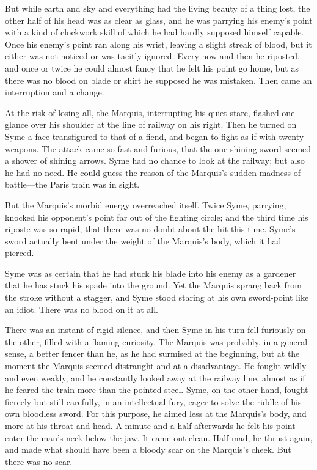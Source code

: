But while earth and sky and everything had the living beauty of a thing lost, the other half of his head was as clear as glass, and he was parrying his enemy’s point with a kind of clockwork skill of which he had hardly supposed himself capable. Once his enemy’s point ran along his wrist, leaving a slight streak of blood, but it either was not noticed or was tacitly ignored. Every now and then he riposted, and once or twice he could almost fancy that he felt his point go home, but as there was no blood on blade or shirt he supposed he was mistaken. Then came an interruption and a change.

At the risk of losing all, the Marquis, interrupting his quiet stare, flashed one glance over his shoulder at the line of railway on his right. Then he turned on Syme a face transfigured to that of a fiend, and began to fight as if with twenty weapons. The attack came so fast and furious, that the one shining sword seemed a shower of shining arrows. Syme had no chance to look at the railway; but also he had no need. He could guess the reason of the Marquis’s sudden madness of battle⁠—the Paris train was in sight.

But the Marquis’s morbid energy overreached itself. Twice Syme, parrying, knocked his opponent’s point far out of the fighting circle; and the third time his riposte was so rapid, that there was no doubt about the hit this time. Syme’s sword actually bent under the weight of the Marquis’s body, which it had pierced.

Syme was as certain that he had stuck his blade into his enemy as a gardener that he has stuck his spade into the ground. Yet the Marquis sprang back from the stroke without a stagger, and Syme stood staring at his own sword-point like an idiot. There was no blood on it at all.

There was an instant of rigid silence, and then Syme in his turn fell furiously on the other, filled with a flaming curiosity. The Marquis was probably, in a general sense, a better fencer than he, as he had surmised at the beginning, but at the moment the Marquis seemed distraught and at a disadvantage. He fought wildly and even weakly, and he constantly looked away at the railway line, almost as if he feared the train more than the pointed steel. Syme, on the other hand, fought fiercely but still carefully, in an intellectual fury, eager to solve the riddle of his own bloodless sword. For this purpose, he aimed less at the Marquis’s body, and more at his throat and head. A minute and a half afterwards he felt his point enter the man’s neck below the jaw. It came out clean. Half mad, he thrust again, and made what should have been a bloody scar on the Marquis’s cheek. But there was no scar.

